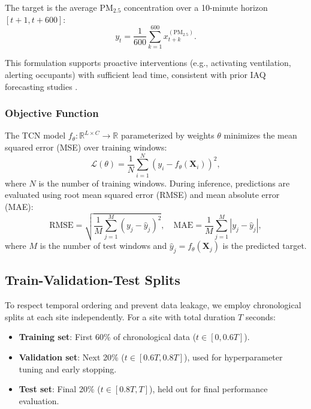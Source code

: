 The target is the average PM$_{2.5}$ concentration over a 10-minute horizon $[t+1, t+600]$:
\begin{equation}
y_t = \frac{1}{600} \sum_{k=1}^{600} x_{t+k}^{(\text{PM}_{2.5})}.
\label{eq:target}
\end{equation}

This formulation supports proactive interventions (e.g., activating ventilation, alerting occupants) with sufficient lead time, consistent with prior IAQ forecasting studies \cite{nguyen2025aiot, yildiz2025development}.

\subsubsection{Objective Function}

The TCN model $f_\theta: \mathbb{R}^{L \times C} \rightarrow \mathbb{R}$ parameterized by weights $\theta$ minimizes the mean squared error (MSE) over training windows:
\begin{equation}
\mathcal{L}(\theta) = \frac{1}{N} \sum_{i=1}^{N} \left( y_i - f_\theta(\mathbf{X}_i) \right)^2,
\label{eq:objective}
\end{equation}
where $N$ is the number of training windows. During inference, predictions are evaluated using root mean squared error (RMSE) and mean absolute error (MAE):
\begin{equation}
\text{RMSE} = \sqrt{\frac{1}{M} \sum_{j=1}^{M} (y_j - \hat{y}_j)^2}, \quad
\text{MAE} = \frac{1}{M} \sum_{j=1}^{M} |y_j - \hat{y}_j|,
\label{eq:metrics}
\end{equation}
where $M$ is the number of test windows and $\hat{y}_j = f_\theta(\mathbf{X}_j)$ is the predicted target.

\subsection{Train-Validation-Test Splits}

To respect temporal ordering and prevent data leakage, we employ chronological splits at each site independently. For a site with total duration $T$ seconds:
\begin{itemize}
\item \textbf{Training set}: First 60\% of chronological data ($t \in [0, 0.6T]$).
\item \textbf{Validation set}: Next 20\% ($t \in [0.6T, 0.8T]$), used for hyperparameter tuning and early stopping.
\item \textbf{Test set}: Final 20\% ($t \in [0.8T, T]$), held out for final performance evaluation.
\end{itemize}

